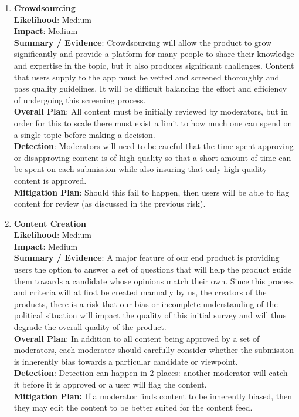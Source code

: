 \documentclass[11pt]{article}
\begin{document}
\begin{enumerate}[nolistsep]
    \item \textbf{Crowdsourcing}\\
        \textbf{Likelihood}: Medium\\
        \textbf{Impact}: Medium\\
        \textbf{Summary / Evidence}: Crowdsourcing will allow the product to grow significantly and provide a platform for many people to share their knowledge and expertise in the topic, but it also produces significant challenges. Content that users supply to the app must be vetted and screened thoroughly and pass quality guidelines. It will be difficult balancing the effort and efficiency of undergoing this screening process.\\
        \textbf{Overall Plan}: All content must be initially reviewed by moderators, but in order for this to scale there must exist a limit to how much one can spend on a single topic before making a decision. \\
        \textbf{Detection}: Moderators will need to be careful that the time spent approving or disapproving content is of high quality so that a short amount of time can be spent on each submission while also insuring that only high quality content is approved.\\
        \textbf{Mitigation Plan}: Should this fail to happen, then users will be able to flag content for review (as discussed in the previous risk).\\[-10pt]

    \item \textbf{Content Creation}\\
        \textbf{Likelihood}: Medium\\
        \textbf{Impact}: Medium\\
        \textbf{Summary / Evidence}: A major feature of our end product is providing users the option to answer a set of questions that will help the product guide them towards a candidate whose opinions match their own. Since this process and criteria will at first be created manually by us, the creators of the products, there is a risk that our bias or incomplete understanding of the political situation will impact the quality of this initial survey and will thus degrade the overall quality of the product.\\
        \textbf{Overall Plan}: In addition to all content being approved by a set of moderators, each moderator should carefully consider whether the submission is inherently bias towards a particular candidate or viewpoint. \\
        \textbf{Detection}: Detection can happen in 2 places: another moderator will catch it before it is approved or a user will flag the content.\\
        \textbf{Mitigation Plan:} If a moderator finds content to be inherently biased, then they may edit the content to be better suited for the content feed.\\[-10pt]


\end{enumerate}
\end{document}
